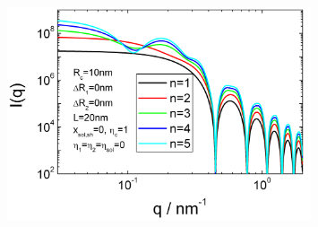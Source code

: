 \begin{figure}[htb]
\begin{center}
\includegraphics[width=0.8\textwidth,height=0.5\textwidth]{../images/form_factor/cluster/TetraHedronDoubleShell.png}
\end{center}
\caption{}
\label{fig:TetrahedronDoubleShell}
\end{figure}
